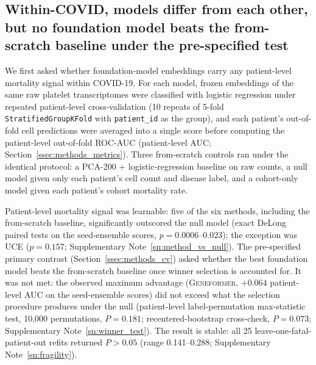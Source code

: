 \documentclass[11pt,a4paper]{article}
\newcommand{\model}[1]{\textsc{#1}}
\begin{document}
\subsection{Within-COVID, models differ from each other, but no foundation model beats the from-scratch baseline under the pre-specified test}
\label{ssec:r1_within_covid}

We first asked whether foundation-model embeddings carry any patient-level
mortality signal within COVID-19. For each model, frozen embeddings of the same
raw platelet transcriptomes were classified with logistic regression under
repeated patient-level cross-validation (10 repeats of 5-fold
\texttt{StratifiedGroupKFold} with \texttt{patient\_id} as the group), and each
patient's out-of-fold cell predictions were averaged into a single score before
computing the patient-level out-of-fold ROC-AUC (patient-level AUC;
Section~\ref{ssec:methods_metrics}). Three from-scratch controls ran under the
identical protocol: a PCA-200 + logistic-regression baseline on raw counts, a
null model given only each patient's cell count and disease label, and a
cohort-only model given each patient's cohort mortality rate.

Patient-level mortality signal was learnable: five of the six methods,
including the from-scratch baseline, significantly outscored the null model
(exact DeLong paired tests on the seed-ensemble scores, $p = 0.0006$--$0.023$);
the exception was \model{UCE} ($p = 0.157$; Supplementary
Note~\ref{sn:method_vs_null}). The pre-specified primary contrast
(Section~\ref{ssec:methods_cv}) asked whether the best foundation model beats
the from-scratch baseline once winner selection is accounted for. It was not
met: the observed maximum advantage (\model{Geneformer}, $+0.064$
patient-level AUC on the seed-ensemble scores) did not exceed what the
selection procedure produces under the null (patient-level label-permutation
max-statistic test, 10{,}000 permutations, $P = 0.181$; recentered-bootstrap
cross-check, $P = 0.073$; Supplementary Note~\ref{sn:winner_test}). The result
is stable: all 25 leave-one-fatal-patient-out refits returned $P > 0.05$
(range 0.141--0.288; Supplementary Note~\ref{sn:fragility}).
\end{document}
